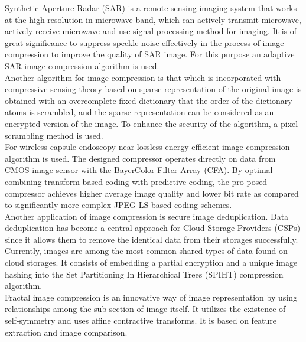 \documentclass[10pt,a4paper,journal]{IEEEtran}
\begin{document}
\hspace{2em}    Synthetic Aperture Radar (SAR)\cite{1} is a remote sensing imaging system that works at the high resolution in microwave band, which can actively transmit microwave, actively receive microwave and use signal processing method for imaging. It is of great significance to suppress speckle noise effectively in the process of image compression to improve the quality of SAR image. For this purpose an adaptive SAR image compression algorithm is used. \\
    \hspace*{2em}  Another algorithm for image compression is that which is incorporated with compressive sensing theory based on sparse representation of the original image is obtained with an overcomplete fixed dictionary that the order of the dictionary atoms is scrambled, and the sparse representation can be considered as an encrypted version of the image. To enhance the security of the algorithm, a pixel-scrambling method is used.\\
    \hspace*{2em} For wireless capsule endoscopy near-lossless energy-efficient image compression algorithm is used. The designed compressor operates directly on data from CMOS image sensor with the BayerColor Filter Array (CFA). By optimal combining transform-based coding with predictive coding, the pro-posed compressor achieves higher average image quality and lower bit rate as compared to significantly more complex JPEG-LS based coding schemes.\\
   \hspace*{2em} Another application of image compression is secure image deduplication. Data deduplication has become a central approach for Cloud Storage Providers (CSPs) since it allows them to remove the identical data from their storages successfully. Currently, images are among the most common shared types of data found on cloud storages. It consists of embedding a partial encryption and a unique image hashing into the Set Partitioning In Hierarchical Trees (SPIHT) compression algorithm.\\
    \hspace*{2em} Fractal image compression is an innovative way of image representation by using relationships among the sub-section of image itself. It utilizes the existence of self-symmetry and uses affine contractive transforms. It is based on feature extraction and image comparison.
    
\end{document}
